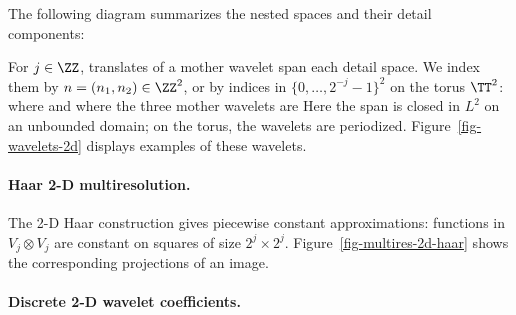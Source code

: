 The following diagram summarizes the nested spaces and their detail components:
\begin{center}
\end{center}

For $j \in \ZZ$, translates of a mother wavelet span each detail space. We index them by $n=(n_1,n_2)\in\ZZ^2$, or by indices in $\{0,\ldots,2^{-j}-1\}^2$ on the torus $\TT^2$:
where
and where the three mother wavelets are
Here the span is closed in $L^2$ on an unbounded domain; on the torus, the wavelets are periodized. Figure~\ref{fig-wavelets-2d} displays examples of these wavelets.



  
\paragraph{Haar 2-D multiresolution.}

The 2-D Haar construction gives piecewise constant approximations: functions in $V_j \otimes V_j$ are constant on squares of size $2^j \times 2^j$. Figure~\ref{fig-multires-2d-haar} shows the corresponding projections of an image.


  
\paragraph{Discrete 2-D wavelet coefficients.}

